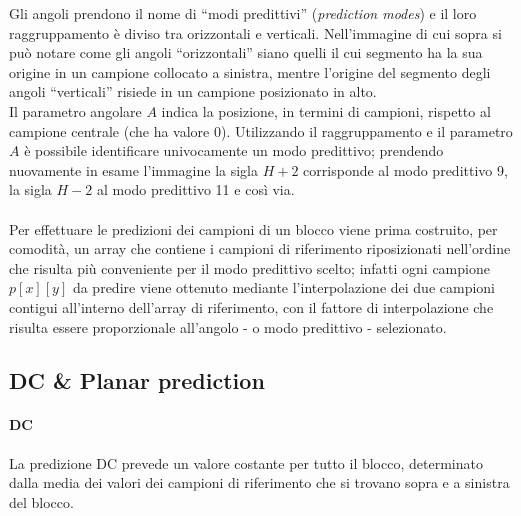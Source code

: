 Gli angoli prendono il nome di ``modi predittivi'' (\emph{prediction modes}) e 
il loro raggruppamento è diviso tra orizzontali e verticali.
Nell'immagine di cui sopra si può notare come gli angoli ``orizzontali'' siano 
quelli il cui segmento ha la sua origine in un campione collocato a sinistra, 
mentre l'origine del segmento degli angoli ``verticali'' risiede in un campione 
posizionato in alto.\\
Il parametro angolare $A$ indica la posizione, in termini di campioni, rispetto 
al campione centrale (che ha valore $0$).
Utilizzando il raggruppamento e il parametro $A$ è possibile identificare 
univocamente un modo predittivo; prendendo nuovamente in esame l'immagine la 
sigla $H+2$ corrisponde al modo predittivo 9, la sigla $H-2$ al modo predittivo 
11 e così via.
\\ \\
Per effettuare le predizioni dei campioni di un blocco viene prima costruito, 
per comodità, un array che contiene i campioni di riferimento riposizionati 
nell'ordine che risulta più conveniente per il modo predittivo scelto; infatti 
ogni campione $p[x][y]$ da predire viene ottenuto mediante l'interpolazione dei 
due campioni contigui all'interno dell'array di riferimento, con il fattore di 
interpolazione che risulta essere proporzionale all'angolo - o modo predittivo 
- selezionato.

\subsection{DC \& Planar prediction }
\paragraph*{DC} La predizione DC prevede un valore costante per tutto il 
blocco, determinato dalla media dei valori dei campioni di riferimento che si 
trovano sopra e a sinistra del blocco.

